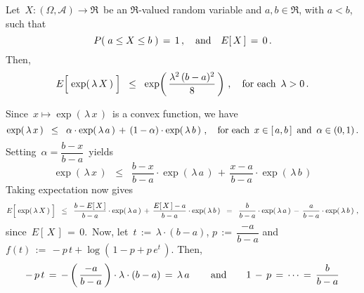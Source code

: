 
\vskip 1.0cm
\begin{lemma}
\label{lemma:HoeffdingLemma}
\mbox{}\vskip 0.2cm
\noindent
Let \,$X : (\Omega,\mathcal{A}) \longrightarrow \Re$\, be an
$\Re$-valued random variable and $a,b \in \Re$, with $a < b$, such that
\begin{equation*}
P\!\left(\;a \leq X \leq b\;\right) \,=\, 1\,,
\quad\textnormal{and}\quad
E\!\left[\,X\,\right] \,=\, 0\,.
\end{equation*}
Then,
\begin{equation*}
E\!\left[\;\overset{{\color{white}-}}{\exp}\!\left(\,\lambda\,X\,\right)\;\right]
	\;\; \leq \;\;
	\exp\!\left(\,\dfrac{\lambda^{2}\,(b-a)^{2}}{8}\,\right)\,,
\quad
\textnormal{for each \,$\lambda > 0$}\,.
\end{equation*}
\end{lemma}
\proof
Since \,$x \longmapsto \exp\!\left(\,\lambda\,x\,\right)$\, is a convex function,
we have
\begin{equation*}
\exp\!\left(\,\lambda\,x\,\right)
\;\; \leq \;\;
	\alpha \cdot \exp\!\left(\,\lambda\,a\,\right)
	\, + \,
	(1-\alpha) \cdot \exp\!\left(\,\lambda\,b\,\right)\,,
\quad
\textnormal{for each \,$x \in [\,a,b\,]$\, and \,$\alpha \in (0,1)$}\,.
\end{equation*}
Setting \,$\alpha = \dfrac{b - x}{b - a}$\, yields
\begin{equation*}
\exp\!\left(\,\lambda\,x\,\right)
\;\; \leq \;\;
	\dfrac{b-x}{b-a} \cdot \exp\!\left(\,\lambda\,a\,\right)
	\, + \,
	\dfrac{x-a}{b-a} \cdot \exp\!\left(\,\lambda\,b\,\right)
\end{equation*}
Taking expectation now gives
\begin{equation*}
E\!\left[\;\overset{{\color{white}-}}{\exp}\!\left(\,\lambda\,X\,\right)\;\right]
\;\; \leq \;\;
	\dfrac{b-E\!\left[\,X\,\right]}{b-a} \cdot \exp\!\left(\,\lambda\,a\,\right)
	\, + \,
	\dfrac{E\!\left[\,X\,\right]-a}{b-a} \cdot \exp\!\left(\,\lambda\,b\,\right)
\;\; = \;\;
	\dfrac{b}{b-a} \cdot \exp\!\left(\,\lambda\,a\,\right)
	\, - \,
	\dfrac{a}{b-a} \cdot \exp\!\left(\,\lambda\,b\,\right)\,,
\end{equation*}
since \,$E\!\left[\,X\,\right] \,=\, 0$.\,
Now, let \,$t \,:=\, \lambda\cdot(b-a)$, \;$p \,:=\, \dfrac{-a}{b-a}$\;
and \,$f(t) \,:=\, -p\,t + \log\!\left(\,1-p+p\,e^{t}\,\right)$.
Then,
\begin{equation*}
-\,p\,t \,=\, -\left(\,\dfrac{-a}{b-a}\,\right)\cdot\lambda\cdot(b-a) \,=\, \lambda\,a\,
\quad\quad\textnormal{and}\quad\quad
1 \, - \, p \,=\, \cdots \,=\, \dfrac{b}{b-a} 
\end{equation*}
